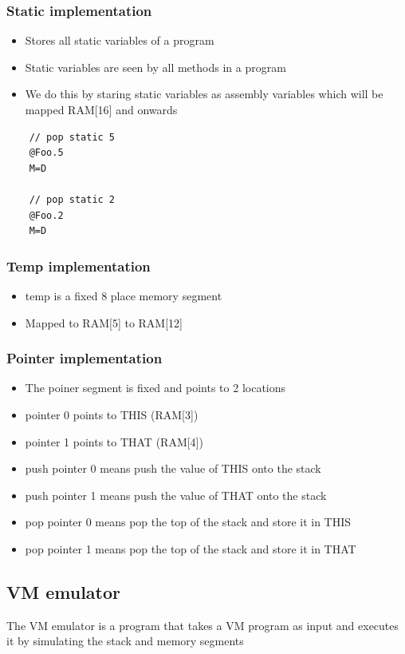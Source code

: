 \documentclass[12pt,a4paper]{article}
\begin{document}
\subsubsection{Static implementation}
\begin{itemize}
    \item Stores all static variables of a program  
    \item Static variables are seen by all methods in a program
    \item We do this by staring static variables as assembly variables which will be mapped RAM[16] and onwards
\end{itemize}

\begin{verbatim}
    // pop static 5
    @Foo.5
    M=D

    // pop static 2
    @Foo.2
    M=D
\end{verbatim}
                        
\subsubsection{Temp implementation}
\begin{itemize}
    \item temp is a fixed 8 place memory segment
    \item Mapped to RAM[5] to RAM[12]
\end{itemize}

\subsubsection{Pointer implementation}
\begin{itemize}
    \item The poiner segment is fixed and points to 2 locations
    \item pointer 0 points to THIS (RAM[3])
    \item pointer 1 points to THAT (RAM[4])
    \item push pointer 0 means push the value of THIS onto the stack
    \item push pointer 1 means push the value of THAT onto the stack
    \item pop pointer 0 means pop the top of the stack and store it in THIS
    \item pop pointer 1 means pop the top of the stack and store it in THAT
\end{itemize}

\subsection{VM emulator}
The VM emulator is a program that takes a VM program as input and executes it by simulating the stack and memory segments
\end{document}
